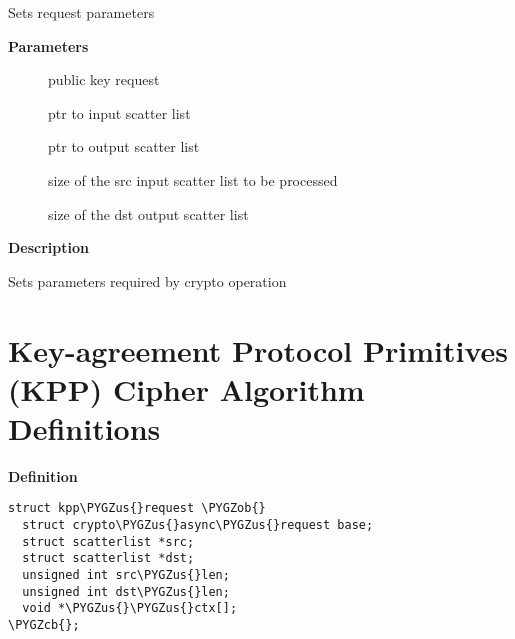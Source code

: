 \documentclass[a4paper,8pt,english]{sphinxmanual}
\def\PYGZus{\char`\_}
\def\PYGZob{\char`\{}
\def\PYGZcb{\char`\}}
\begin{document}
\begin{fulllineitems}
\label{crypto/api-akcipher:c.akcipher_request_set_crypt}
Sets request parameters

\end{fulllineitems}


\textbf{Parameters}
\begin{description}
\item[{}] \leavevmode
public key request

\item[{}] \leavevmode
ptr to input scatter list

\item[{}] \leavevmode
ptr to output scatter list

\item[{}] \leavevmode
size of the src input scatter list to be processed

\item[{}] \leavevmode
size of the dst output scatter list

\end{description}

\textbf{Description}

Sets parameters required by crypto operation


\section{Key-agreement Protocol Primitives (KPP) Cipher Algorithm Definitions}
\label{crypto/api-kpp::doc}\label{crypto/api-kpp:key-agreement-protocol-primitives-kpp-cipher-algorithm-definitions}

\begin{fulllineitems}
\label{crypto/api-kpp:c.kpp_request}
\end{fulllineitems}


\textbf{Definition}

\begin{Verbatim}[commandchars=\\\{\}]
struct kpp\PYGZus{}request \PYGZob{}
  struct crypto\PYGZus{}async\PYGZus{}request base;
  struct scatterlist *src;
  struct scatterlist *dst;
  unsigned int src\PYGZus{}len;
  unsigned int dst\PYGZus{}len;
  void *\PYGZus{}\PYGZus{}ctx[];
\PYGZcb{};
\end{Verbatim}
\end{document}
